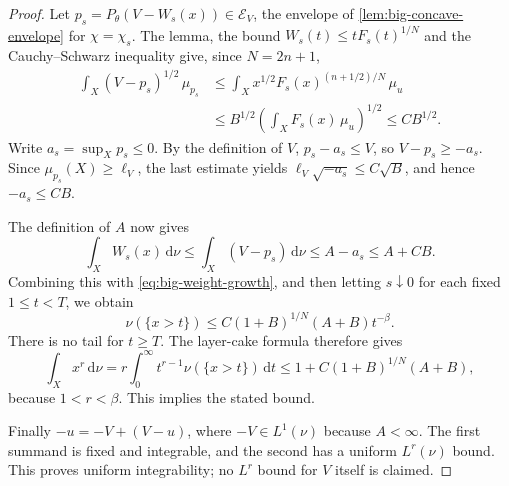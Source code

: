 \begin{proof}
Let $p_s=P_\theta(V-W_s(x))\in\mathcal E_V$, the envelope of \cref{lem:big-concave-envelope} for $\chi=\chi_s$. The lemma, the bound $W_s(t)\leq tF_s(t)^{1/N}$ and the Cauchy--Schwarz inequality give, since $N=2n+1$,
\[
 \begin{split}
 \int_X(V-p_s)^{1/2}\,\mu_{p_s}
 &\leq\int_X x^{1/2}F_s(x)^{(n+1/2)/N}\,\mu_u\\
 &\leq B^{1/2}\left(\int_XF_s(x)\,\mu_u\right)^{1/2}
 \leq C B^{1/2}.
 \end{split}
\]
Write $a_s=\sup_Xp_s\leq0$. By the definition of $V$, $p_s-a_s\leq V$, so $V-p_s\geq-a_s$. Since $\mu_{p_s}(X)\geq\ell_V$, the last estimate yields $\ell_V\sqrt{-a_s}\leq C\sqrt B$, and hence $-a_s\leq CB$.

The definition of $A$ now gives
\[
 \int_XW_s(x)\,\mathrm{d}\nu
 \leq\int_X(V-p_s)\,\mathrm{d}\nu
 \leq A-a_s\leq A+CB.
\]
Combining this with \eqref{eq:big-weight-growth}, and then letting $s\downarrow0$ for each fixed $1\leq t<T$, we obtain
\[
 \nu(\{x>t\})\leq C(1+B)^{1/N}(A+B)t^{-\beta}.
\]
There is no tail for $t\geq T$. The layer-cake formula therefore gives
\[
 \int_Xx^r\,\mathrm{d}\nu
 =r\int_0^\infty t^{r-1}\nu(\{x>t\})\,\mathrm{d}t
 \leq1+C(1+B)^{1/N}(A+B),
\]
because $1<r<\beta$. This implies the stated bound.

Finally $-u=-V+(V-u)$, where $-V\in L^1(\nu)$ because $A<\infty$. The first summand is fixed and integrable, and the second has a uniform $L^r(\nu)$ bound. This proves uniform integrability; no $L^r$ bound for $V$ itself is claimed.
\end{proof}
